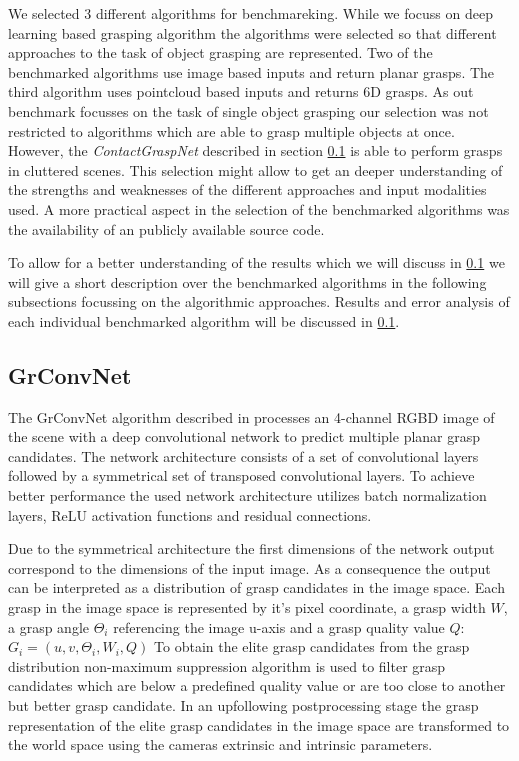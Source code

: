 We selected 3 different algorithms for benchmareking.
While we focuss on deep learning based grasping algorithm the algorithms were selected so that different approaches to the task of object grasping
are represented.
Two of the benchmarked algorithms use image based inputs and return planar grasps.
The third algorithm uses pointcloud based inputs and returns 6D grasps.
As out benchmark focusses on the task of single object grasping our selection was not restricted to algorithms which are able to grasp multiple objects at once.
However, the \textit{ContactGraspNet} described in section \ref{} is able to perform grasps in cluttered scenes.
This selection might allow to get an deeper understanding of the strengths and weaknesses of the different approaches and input modalities used.
A more practical aspect in the selection of the benchmarked algorithms was the availability of an publicly available source code.


To allow for a better understanding of the results which we will discuss in \ref{} we will give a short description over the benchmarked
algorithms in the following subsections focussing on the algorithmic approaches.
Results and error analysis of each individual benchmarked algorithm will be discussed in \ref{}.


\subsection{GrConvNet}
The GrConvNet algorithm described in \cite{kumra2020antipodal} processes an 4-channel RGBD image of the scene with a deep convolutional network to predict multiple
planar grasp candidates.
The network architecture consists of a set of convolutional layers followed by a symmetrical set of transposed convolutional layers.
To achieve better performance the used network architecture utilizes batch normalization layers, ReLU activation functions and residual connections.

Due to the symmetrical architecture the first dimensions of the network output correspond to the dimensions of the input image.
As a consequence the output can be interpreted as a distribution of grasp candidates in the image space.
Each grasp in the image space is represented by it's pixel coordinate, a grasp width $W$, a grasp angle $\Theta_i$ referencing the image u-axis and a grasp quality value $Q$:
$G_i = (u,v,\Theta_i, W_i, Q)$
To obtain the elite grasp candidates from the grasp distribution non-maximum suppression algorithm is used to filter grasp candidates which are below a predefined
quality value or are too close to another but better grasp candidate.
In an upfollowing postprocessing stage the grasp representation of the elite grasp candidates in the image space are transformed to the world space using the
cameras extrinsic and intrinsic parameters.

